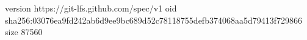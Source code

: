 version https://git-lfs.github.com/spec/v1
oid sha256:03076ea9fd242ab6d9ee9bc689d52c78118755defb374068aa5d79413f729866
size 87560
